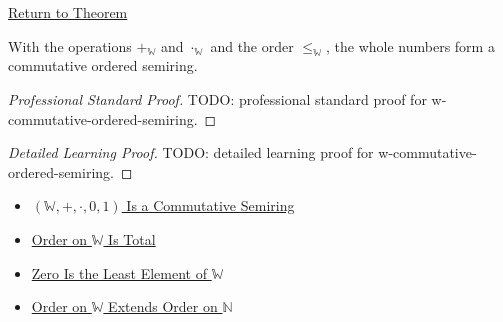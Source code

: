 \newpage
{}
\label{prf:w-commutative-ordered-semiring}

\begin{remark*}[Return]
\hyperref[thm:w-commutative-ordered-semiring]{Return to Theorem}
\end{remark*}

\begin{theorem*}
With the operations $+_{\mathbb{W}}$ and $\cdot_{\mathbb{W}}$ and the order
$\le_{\mathbb{W}}$, the whole numbers form a commutative ordered semiring.
\end{theorem*}

\begin{proof}[Professional Standard Proof]
\LRAProofBodyStart
TODO: professional standard proof for w-commutative-ordered-semiring.
\end{proof}

\begin{proof}[Detailed Learning Proof]
\LRAProofBodyStart
TODO: detailed learning proof for w-commutative-ordered-semiring.
\end{proof}

\begin{remark*}
\end{remark*}

\begin{dependencies}
\begin{itemize}
  \item \hyperref[thm:w-commutative-semiring]{$(\mathbb{W},+,\cdot,0,1)$ Is a Commutative Semiring}
  \item \hyperref[thm:order-on-w-total]{Order on $\mathbb{W}$ Is Total}
  \item \hyperref[thm:zero-least-element-of-w]{Zero Is the Least Element of $\mathbb{W}$}
  \item \hyperref[thm:order-on-w-extends-order-on-n]{Order on $\mathbb{W}$ Extends Order on $\mathbb{N}$}
\end{itemize}
\end{dependencies}

\clearpage
